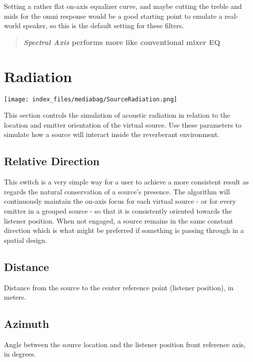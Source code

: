 \documentclass[
  letterpaper,
  DIV=11,
  numbers=noendperiod]{scrreport}
\begin{document}
Setting a rather flat on-axis equalizer curve, and maybe cutting the
treble and mids for the omni response would be a good starting point to
emulate a real-world speaker, so this is the default setting for these
filters.

\begin{quote}
\textbf{\emph{Spectral Axis} performs more like conventional mixer EQ}
\end{quote}

\hypertarget{radiation}{%
\section{Radiation}\label{radiation}}

\texttt{[image: index\_files/mediabag/SourceRadiation.png]}

This section controls the simulation of acoustic radiation in relation
to the location and emitter orientation of the virtual source. Use these
parameters to simulate how a source will interact inside the reverberant
environment.

\hypertarget{relative-direction}{%
\subsection{Relative Direction}\label{relative-direction}}

This switch is a very simple way for a user to achieve a more consistent
result as regards the natural conservation of a source's presence. The
algorithm will continuously maintain the on-axis focus for each virtual
source - or for every emitter in a grouped source - so that it is
consistently oriented towards the listener position. When not engaged, a
source remains in the same constant direction which is what might be
preferred if something is passing through in a spatial design.

\hypertarget{distance-1}{%
\subsection{Distance}\label{distance-1}}

Distance from the source to the center reference point (listener
position), in meters.

\hypertarget{azimuth}{%
\subsection{Azimuth}\label{azimuth}}

Angle between the source location and the listener position front
reference axis, in degrees.
\end{document}
